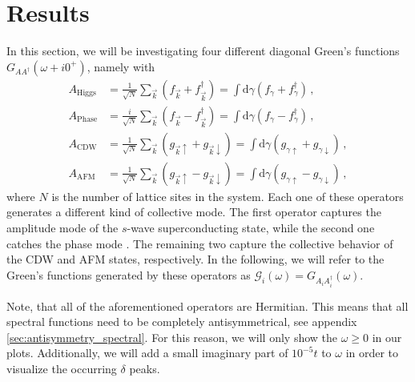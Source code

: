 \documentclass[
    reprint, 
    aps,
    preprintnumbers,
    twocolumn,
    prb,
    superscriptaddress
]{revtex4-2}
\newcommand{\vk}{\vec{k}}
\newcommand{\up}{\uparrow}
\newcommand{\down}{\downarrow}
\newcommand{\dgamma}{\mathrm{d}\gamma}
\begin{document}
\section{Results}\label{sec:results}

In this section, we will be investigating four different diagonal Green's functions $G_{AA^\dagger}(\omega + i0^+)$, namely with
\begin{subequations}
    \label{eqn:resolvent_bases}
    \begin{align}
        A_\text{Higgs} &= \frac{1}{\sqrt{N}} \sum_{\vk} \left( f_{\vk} + f_{\vk}^\dagger \right)  
            = \int \dgamma \left( f_{\gamma} + f_{\gamma}^\dagger \right) \,,\\
        A_\text{Phase} &= \frac{i}{\sqrt{N}} \sum_{\vk} \left( f_{\vk} - f_{\vk}^\dagger \right) = \int \dgamma \left( f_{\gamma} - f_{\gamma}^\dagger \right) \,,\\
        A_\text{CDW}   &= \frac{1}{\sqrt{N}} \sum_{\vk} \left( g_{\vk \up} + g_{\vk \down} \right) = \int \dgamma \left( g_{\gamma \up} + g_{\gamma \down} \right) \,,\\
        A_\text{AFM}   &= \frac{1}{\sqrt{N}} \sum_{\vk} \left( g_{\vk \up} - g_{\vk \down} \right) = \int \dgamma \left( g_{\gamma \up} - g_{\gamma \down} \right) \,,
    \end{align}
\end{subequations}
where $N$ is the number of lattice sites in the system. 
Each one of these operators generates a different kind of collective mode.
The first operator captures the amplitude mode of the $s$-wave superconducting state, while the second one catches the phase mode \cite{Fan22}.
The remaining two capture the collective behavior of the CDW and AFM states, respectively.
In the following, we will refer to the Green's functions generated by these operators as $\mathcal{G}_{i}(\omega) = G_{A_i A_i^\dagger}(\omega)$.

Note, that all of the aforementioned operators are Hermitian. 
This means that all spectral functions need to be completely antisymmetrical, see appendix \autoref{sec:antisymmetry_spectral}.
For this reason, we will only show the $\omega \geq 0$ in our plots. 
Additionally, we will add a small imaginary part of $10^{-5}t$ to $\omega$ in order to visualize the occurring $\delta$ peaks.

\end{document}

